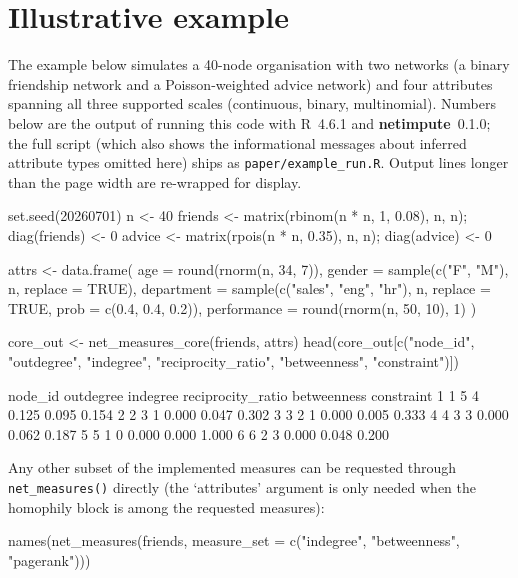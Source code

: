 \documentclass[11pt,a4paper]{article}
\newcommand{\pkg}[1]{\textbf{#1}}
\newcommand{\code}[1]{\texttt{#1}}
\newcommand{\proglang}[1]{\textsf{#1}}
\begin{document}
\section{Illustrative example}
\label{sec:example}

The example below simulates a 40-node organisation with two networks (a
binary friendship network and a Poisson-weighted advice network) and four
attributes spanning all three supported scales (continuous, binary,
multinomial). Numbers below are the output of running this code with
\proglang{R}~4.6.1 and \pkg{netimpute}~0.1.0; the full script (which also
shows the informational messages about inferred attribute types omitted
here) ships as \code{paper/example\_run.R}. Output lines longer than the
page width are re-wrapped for display.

\begin{Rinput}
set.seed(20260701)
n <- 40
friends <- matrix(rbinom(n * n, 1, 0.08), n, n); diag(friends) <- 0
advice  <- matrix(rpois(n * n, 0.35), n, n);     diag(advice)  <- 0

attrs <- data.frame(
  age         = round(rnorm(n, 34, 7)),
  gender      = sample(c("F", "M"), n, replace = TRUE),
  department  = sample(c("sales", "eng", "hr"), n, replace = TRUE,
                        prob = c(0.4, 0.4, 0.2)),
  performance = round(rnorm(n, 50, 10), 1)
)

core_out <- net_measures_core(friends, attrs)
head(core_out[c("node_id", "outdegree", "indegree",
                "reciprocity_ratio", "betweenness", "constraint")])
\end{Rinput}

\begin{Routput}
  node_id outdegree indegree reciprocity_ratio betweenness constraint
1       1         5        4             0.125       0.095      0.154
2       2         3        1             0.000       0.047      0.302
3       3         2        1             0.000       0.005      0.333
4       4         3        3             0.000       0.062      0.187
5       5         1        0             0.000       0.000      1.000
6       6         2        3             0.000       0.048      0.200
\end{Routput}

Any other subset of the implemented measures can be requested through
\code{net\_measures()} directly (the `attributes' argument is only needed when
the homophily block is among the requested measures):

\begin{Rinput}
names(net_measures(friends, measure_set = c("indegree", "betweenness",
                                            "pagerank")))
\end{Rinput}
\end{document}
